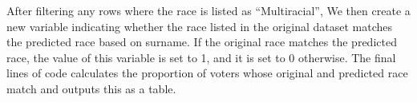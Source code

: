 \documentclass[
]{article}
\newenvironment{Shaded}{}{}
\newcommand{\AttributeTok}[1]{#1}
\newcommand{\DecValTok}[1]{#1}
\newcommand{\FunctionTok}[1]{#1}
\newcommand{\NormalTok}[1]{#1}
\newcommand{\OtherTok}[1]{\textcolor[rgb]{1.00,0.25,0.00}{#1}}
\newcommand{\SpecialCharTok}[1]{\textcolor[rgb]{0.00,0.50,0.50}{#1}}
\newcommand{\StringTok}[1]{\textcolor[rgb]{0.00,0.50,0.50}{#1}}
\begin{document}
\begin{Shaded}
\end{Shaded}

After filtering any rows where the race is listed as ``Multiracial'', We
then create a new variable indicating whether the race listed in the
original dataset matches the predicted race based on surname. If the
original race matches the predicted race, the value of this variable is
set to 1, and it is set to 0 otherwise. The final lines of code
calculates the proportion of voters whose original and predicted race
match and outputs this as a table.
\end{document}
